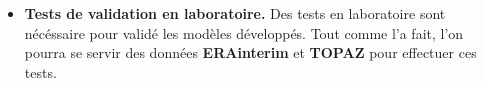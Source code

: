 \begin{itemize}
    \item \textbf{Tests de validation en laboratoire.} Des tests en laboratoire sont nécéssaire pour validé les modèles développés. Tout comme \citeauthor{rabatel2015thesis} l'a fait, l'on pourra se servir des données \textbf{ERAinterim} et \textbf{TOPAZ} pour effectuer ces tests.
\end{itemize}





